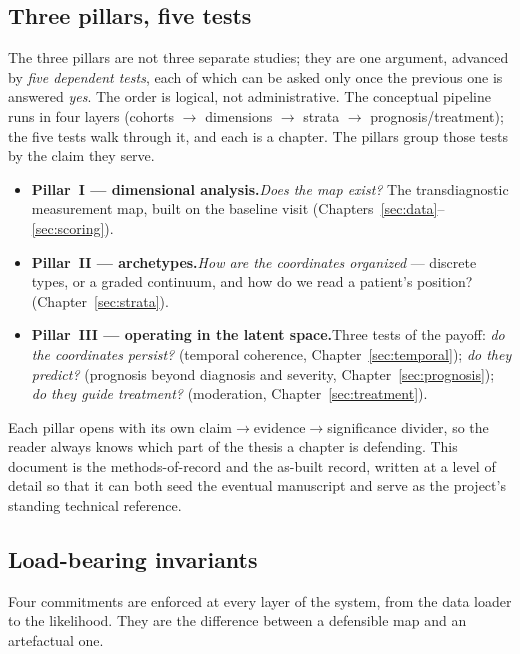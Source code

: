 \subsection{Three pillars, five tests}
The three pillars are not three separate studies; they are one argument, advanced by \emph{five dependent
tests}, each of which can be asked only once the previous one is answered \emph{yes}. The order is logical, not
administrative. The conceptual pipeline runs in four layers (cohorts $\to$ dimensions $\to$ strata $\to$
prognosis/treatment); the five tests walk through it, and each is a chapter. The pillars group those tests by
the claim they serve.


\begin{itemize}\setlength{\itemsep}{1pt}
  \item \textbf{Pillar~I --- dimensional analysis.}\quad \emph{Does the map exist?} The transdiagnostic
  measurement map, built on the baseline visit (Chapters~\ref{sec:data}--\ref{sec:scoring}).
  \item \textbf{Pillar~II --- archetypes.}\quad \emph{How are the coordinates organized} --- discrete types, or
  a graded continuum, and how do we read a patient's position? (Chapter~\ref{sec:strata}).
  \item \textbf{Pillar~III --- operating in the latent space.}\quad Three tests of the payoff: \emph{do the
  coordinates persist?} (temporal coherence, Chapter~\ref{sec:temporal}); \emph{do they predict?} (prognosis
  beyond diagnosis and severity, Chapter~\ref{sec:prognosis}); \emph{do they guide treatment?} (moderation,
  Chapter~\ref{sec:treatment}).
\end{itemize}

Each pillar opens with its own claim$\to$evidence$\to$significance divider, so the reader always knows which
part of the thesis a chapter is defending. This document is the methods-of-record and the as-built record,
written at a level of detail so that it can both seed the eventual manuscript and serve as the project's
standing technical reference.

\subsection{Load-bearing invariants}
Four commitments are enforced at every layer of the system, from the data loader to the likelihood. They are
the difference between a defensible map and an artefactual one.

